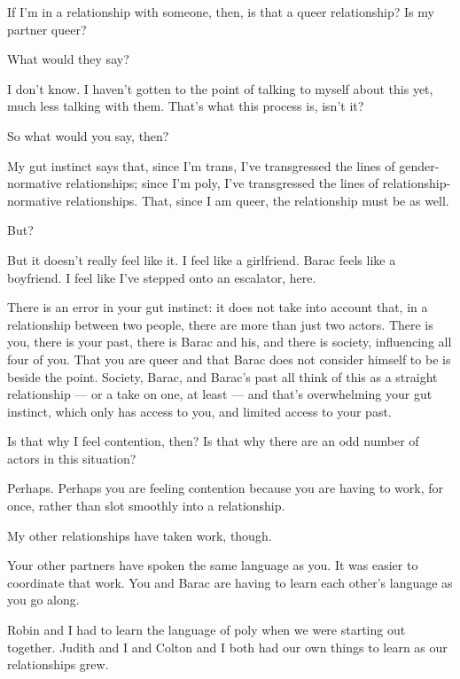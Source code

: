 \begin{leftcolumn}
If I'm in a relationship with someone, then, is that a queer relationship? Is my partner queer?

\begin{ally}
What would they say?
\end{ally}
I don't know. I haven't gotten to the point of talking to myself about this yet, much less talking with them. That's what this process is, isn't it?

\begin{ally}
So what would you say, then?
\end{ally}
My gut instinct says that, since I'm trans, I've transgressed the lines of gender-normative relationships; since I'm poly, I've transgressed the lines of relationship-normative relationships. That, since I am queer, the relationship must be as well.

\begin{ally}
But?
\end{ally}
But it doesn't really feel like it. I feel like a girlfriend. Barac feels like a boyfriend. I feel like I've stepped onto an escalator, here.

\begin{ally}
There is an error in your gut instinct: it does not take into account that, in a relationship between two people, there are more than just two actors. There is you, there is your past, there is Barac and his, and there is society, influencing all four of you. That you are queer and that Barac does not consider himself to be is beside the point. Society, Barac, and Barac's past all think of this as a straight relationship --- or a take on one, at least --- and that's overwhelming your gut instinct, which only has access to you, and limited access to your past.
\end{ally}
Is that why I feel contention, then? Is that why there are an odd number of actors in this situation?

\begin{ally}
Perhaps. Perhaps you are feeling contention because you are having to work, for once, rather than slot smoothly into a relationship.
\end{ally}
My other relationships have taken work, though.

\begin{ally}
Your other partners have spoken the same language as you. It was easier to coordinate that work. You and Barac are having to learn each other's language as you go along.
\end{ally}
Robin and I had to learn the language of poly when we were starting out together. Judith and I and Colton and I both had our own things to learn as our relationships grew.


\end{leftcolumn}
